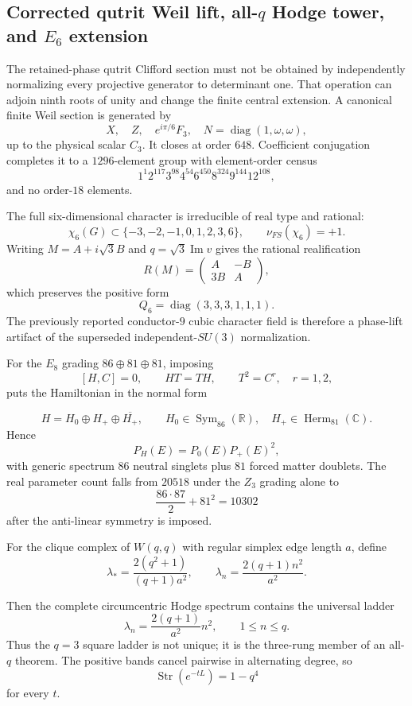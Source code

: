 \subsection*{Corrected qutrit Weil lift, all-$q$ Hodge tower, and $E_6$ extension}

The retained-phase qutrit Clifford section must not be obtained by independently
normalizing every projective generator to determinant one.  That operation can
adjoin ninth roots of unity and change the finite central extension.  A canonical
finite Weil section is generated by
\[
X,\quad Z,\quad e^{i\pi/6}F_3,\quad
N=\operatorname{diag}(1,\omega,\omega),
\]
up to the physical scalar $C_3$.  It closes at order $648$.  Coefficient
conjugation completes it to a $1296$-element group with element-order census
\[
\boxed{1^1 2^{117} 3^{98} 4^{54} 6^{450} 8^{324} 9^{144} 12^{108}},
\]
and no order-$18$ elements.

The full six-dimensional character is irreducible of real type and rational:
\[
\boxed{\chi_6(G)\subset\{-3,-2,-1,0,1,2,3,6\}},
\qquad
\nu_{FS}(\chi_6)=+1.
\]
Writing $M=A+i\sqrt3 B$ and $q=\sqrt3\operatorname{Im}v$ gives the rational
realification
\[
\boxed{R(M)=\begin{pmatrix}A&-B\\3B&A\end{pmatrix}},
\]
which preserves the positive form
\[
\boxed{Q_6=\operatorname{diag}(3,3,3,1,1,1)}.
\]
The previously reported conductor-$9$ cubic character field is therefore a
phase-lift artifact of the superseded independent-$SU(3)$ normalization.

For the $E_8$ grading $86\oplus81\oplus81$, imposing
\[
[H,C]=0,\qquad HT=TH,\qquad T^2=C^r,\quad r=1,2,
\]
puts the Hamiltonian in the normal form

\[
\boxed{H=H_0\oplus H_+\oplus\overline{H_+}},
\qquad
H_0\in\operatorname{Sym}_{86}(\mathbb R),\quad
H_+\in\operatorname{Herm}_{81}(\mathbb C).
\]
Hence
\[
\boxed{P_H(E)=P_0(E)P_+(E)^2},
\]
with generic spectrum $86$ neutral singlets plus $81$ forced matter doublets.
The real parameter count falls from $20518$ under the $Z_3$ grading alone to
\[
\boxed{\frac{86\cdot87}{2}+81^2=10302}
\]
after the anti-linear symmetry is imposed.

For the clique complex of $W(q,q)$ with regular simplex edge length $a$, define
\[
\lambda_*=\frac{2(q^2+1)}{(q+1)a^2},
\qquad
\lambda_n=\frac{2(q+1)n^2}{a^2}.
\]

Then the complete circumcentric Hodge spectrum contains the universal ladder
\[
\boxed{\lambda_n=\frac{2(q+1)}{a^2}n^2,\qquad1\le n\le q}.
\]
Thus the $q=3$ square ladder is not unique; it is the three-rung member of an
all-$q$ theorem.  The positive bands cancel pairwise in alternating degree, so
\[
\boxed{\operatorname{Str}(e^{-tL})=1-q^4}
\]
for every $t$.

